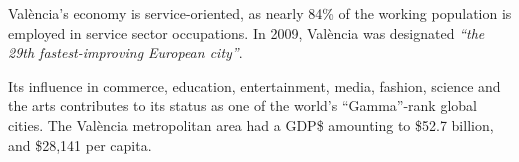 \documentclass{article}
\begin{document}

Val\`{e}ncia's economy is service-oriented, as nearly 84\% of the working population
is employed in service sector occupations. In 2009, Val\`{e}ncia was designated \emph{``the
29th fastest-improving European city''}.  

Its influence in commerce, education, entertainment, media, fashion, science
and the arts contributes to its status as one of the world's ``Gamma''-rank
global cities. The Val\`{e}ncia metropolitan area had a GDP\$ amounting to \$52.7
billion, and \$28,141 per capita.
\end{document}
